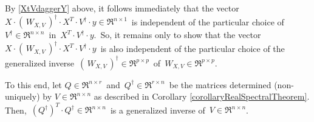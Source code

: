 \begin{enumerate}
	By \eqref{XtVdaggerY} above, it follows immediately that the vector
	\,$X \cdot \left(\,W_{X,V}\,\right)^{\dagger} \cdot X^{T} \cdot V^{\dagger} \cdot y \in \Re^{n \times 1}$\,
	is independent of the particular choice of
	\,$V^{\dagger} \in \Re^{n \times n}$\, in \,$X^{T} \cdot V^{\dagger} \cdot y$.\,
	So, it remains only to show that the vector
	\,$X \cdot \left(\,W_{X,V}\,\right)^{\dagger} \cdot X^{T} \cdot V^{\dagger} \cdot y$\,
	is also independent of the particular choice of the generalized inverse
	\,$\left(\,W_{X,V}\,\right)^{\dagger}  \in \Re^{p \times p}$\,
	of \,$W_{X,V} \in \Re^{p \times p}$.

	To this end, let $Q \in \Re^{n \times r}$\, and \,$Q^{\dagger} \in \Re^{r \times n}$\,
	be the matrices determined (non-uniquely) by $V \in \Re^{n \times n}$
	as described in Corollary \ref{corollaryRealSpectralTheorem}.
	Then, \,$(Q^{\dagger})^{T} \cdot Q^{\dagger} \in \Re^{n \times n}$\,
	is a generalized inverse of \,$V \in \Re^{n \times n}$.


\end{enumerate}
